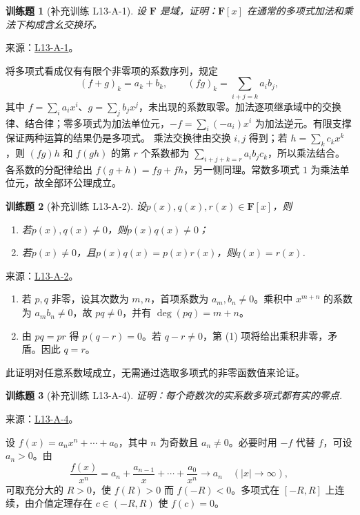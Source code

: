 \documentclass[UTF8,12pt,a4paper,fontset=fandol]{ctexart}
\newtheorem{exercise}{训练题}[section]
\begin{document}
\begin{exercise}[补充训练 L13-A-1]\label{prob:L13-A-1}
设 $\mathbf F$ 是域，证明：$\mathbf F[x]$ 在通常的多项式加法和乘法下构成含幺交换环。
\end{exercise}
\noindent 来源：\href{https://github.com/yhwu-is/Linear-Algebra-Left-Undone/blob/new/%E8%AE%B2%E4%B9%89/%E4%B8%93%E9%A2%98/13%20%E5%A4%9A%E9%A1%B9%E5%BC%8F.tex}{L13-A-1}。
\begin{solve}
将多项式看成仅有有限个非零项的系数序列，规定
\[(f+g)_k=a_k+b_k,\qquad(fg)_k=\sum_{i+j=k}a_ib_j,\]
其中 $f=\sum_ia_ix^i$、$g=\sum_jb_jx^j$，未出现的系数取零。加法逐项继承域中的交换律、结合律；零多项式为加法单位元，$-f=\sum_i(-a_i)x^i$ 为加法逆元。有限支撑保证两种运算的结果仍是多项式。
乘法交换律由交换 $i,j$ 得到；若 $h=\sum_kc_kx^k$，则 $(fg)h$ 和 $f(gh)$ 的第 $r$ 个系数都为 $\sum_{i+j+k=r}a_ib_jc_k$，所以乘法结合。各系数的分配律给出 $f(g+h)=fg+fh$，另一侧同理。常数多项式 $1$ 为乘法单位元，故全部环公理成立。
\end{solve}

\begin{exercise}[补充训练 L13-A-2]\label{prob:L13-A-2}
设$p(x),q(x),r(x)\in\mathbf{F}[x]$，则
        \begin{enumerate}
            \item 若$p(x),q(x)\neq 0$，则$p(x)q(x)\neq 0$；
            \item 若$p(x)\neq 0$，且$p(x)q(x)=p(x)r(x)$，则$q(x)=r(x)$.
        \end{enumerate}
\end{exercise}
\noindent 来源：\href{https://github.com/yhwu-is/Linear-Algebra-Left-Undone/blob/new/%E8%AE%B2%E4%B9%89/%E4%B8%93%E9%A2%98/13%20%E5%A4%9A%E9%A1%B9%E5%BC%8F.tex}{L13-A-2}。
\begin{solve}
\begin{enumerate}
\item 若 $p,q$ 非零，设其次数为 $m,n$，首项系数为 $a_m,b_n\ne0$。乘积中 $x^{m+n}$ 的系数为 $a_mb_n\ne0$，故 $pq\ne0$，并有 $\deg(pq)=m+n$。
\item 由 $pq=pr$ 得 $p(q-r)=0$。若 $q-r\ne0$，第 (1) 项将给出乘积非零，矛盾。因此 $q=r$。
\end{enumerate}
此证明对任意系数域成立，无需通过选取多项式的非零函数值来论证。
\end{solve}

\begin{exercise}[补充训练 L13-A-4]\label{prob:L13-A-4}
证明：每个奇数次的实系数多项式都有实的零点.
\end{exercise}
\noindent 来源：\href{https://github.com/yhwu-is/Linear-Algebra-Left-Undone/blob/new/%E8%AE%B2%E4%B9%89/%E4%B8%93%E9%A2%98/13%20%E5%A4%9A%E9%A1%B9%E5%BC%8F.tex}{L13-A-4}。
\begin{solve}
设 $f(x)=a_nx^n+\cdots+a_0$，其中 $n$ 为奇数且 $a_n\ne0$。必要时用 $-f$ 代替 $f$，可设 $a_n>0$。由
\[\frac{f(x)}{x^n}=a_n+\frac{a_{n-1}}x+\cdots+\frac{a_0}{x^n}\longrightarrow a_n\quad(|x|\to\infty),\]
可取充分大的 $R>0$，使 $f(R)>0$ 而 $f(-R)<0$。多项式在 $[-R,R]$ 上连续，由介值定理存在 $c\in(-R,R)$ 使 $f(c)=0$。
\end{solve}
\end{document}
